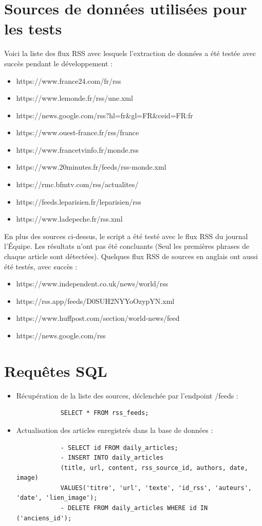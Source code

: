 \documentclass[french]{article}
\begin{document}
    \section*{Sources de données utilisées pour les tests}
    Voici la liste des flux RSS avec lesquels l'extraction de données a été testée avec succès pendant le développement :
    \begin{itemize}
        \item https://www.france24.com/fr/rss
        \item https://www.lemonde.fr/rss/une.xml
        \item https://news.google.com/rss?hl=fr\&gl=FR\&ceid=FR:fr
        \item https://www.ouest-france.fr/rss/france
        \item https://www.francetvinfo.fr/monde.rss
        \item https://www.20minutes.fr/feeds/rss-monde.xml
        \item https://rmc.bfmtv.com/rss/actualites/
        \item https://feeds.leparisien.fr/leparisien/rss
        \item https://www.ladepeche.fr/rss.xml
    \end{itemize}
    En plus des sources ci-dessus, le script a été testé avec le flux RSS du journal l'Équipe. Les résultats n'ont pas été concluants (Seul les premières phrases de chaque article sont détectées).
    Quelques flux RSS de sources en anglais ont aussi été testés, avec succès :
    \begin{itemize}
        \item https://www.independent.co.uk/news/world/rss
        \item https://rss.app/feeds/D0SUH2NYYoOzypYN.xml
        \item https://www.huffpost.com/section/world-news/feed
        \item https://news.google.com/rss
    \end{itemize}
    \section*{Requêtes SQL}
    \begin{itemize}
        \item Récupération de la liste des sources, déclenchée par l'endpoint /feeds : 
        \begin{verbatim}
            SELECT * FROM rss_feeds;
        \end{verbatim}
        \item Actualisation des articles enregistrés dans la base de données :
        \begin{verbatim}
            - SELECT id FROM daily_articles;
            - INSERT INTO daily_articles
            (title, url, content, rss_source_id, authors, date, image) 
            VALUES('titre', 'url', 'texte', 'id_rss', 'auteurs', 'date', 'lien_image');
            - DELETE FROM daily_articles WHERE id IN ('anciens_id');
        \end{verbatim}
    \end{itemize}
\end{document}
